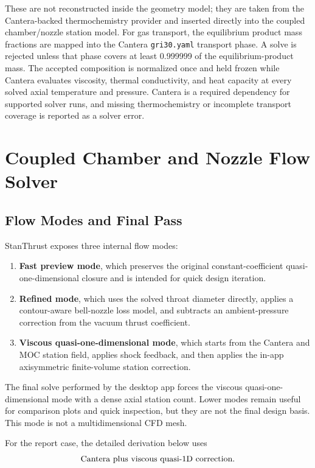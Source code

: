 \documentclass[11pt]{article}
\begin{document}
These are not reconstructed inside the geometry model; they are taken from the Cantera-backed thermochemistry provider and inserted directly into the coupled chamber/nozzle station model. For gas transport, the equilibrium product mass fractions are mapped into the Cantera \texttt{gri30.yaml} transport phase. A solve is rejected unless that phase covers at least 0.999999 of the equilibrium-product mass. The accepted composition is normalized once and held frozen while Cantera evaluates viscosity, thermal conductivity, and heat capacity at every solved axial temperature and pressure. Cantera is a required dependency for supported solver runs, and missing thermochemistry or incomplete transport coverage is reported as a solver error.

\section{Coupled Chamber and Nozzle Flow Solver}
\subsection{Flow Modes and Final Pass}
StanThrust exposes three internal flow modes:
\begin{enumerate}[leftmargin=6mm]
\item \textbf{Fast preview mode}, which preserves the original constant-coefficient quasi-one-dimensional closure and is intended for quick design iteration.
\item \textbf{Refined mode}, which uses the solved throat diameter directly, applies a contour-aware bell-nozzle loss model, and subtracts an ambient-pressure correction from the vacuum thrust coefficient.
\item \textbf{Viscous quasi-one-dimensional mode}, which starts from the Cantera and MOC station field, applies shock feedback, and then applies the in-app axisymmetric finite-volume station correction.
\end{enumerate}
The final solve performed by the desktop app forces the viscous quasi-one-dimensional mode with a dense axial station count. Lower modes remain useful for comparison plots and quick inspection, but they are not the final design basis. This mode is not a multidimensional CFD mesh.

For the report case, the detailed derivation below uses
\[
\text{Cantera plus viscous quasi-1D correction}.
\]
\end{document}
